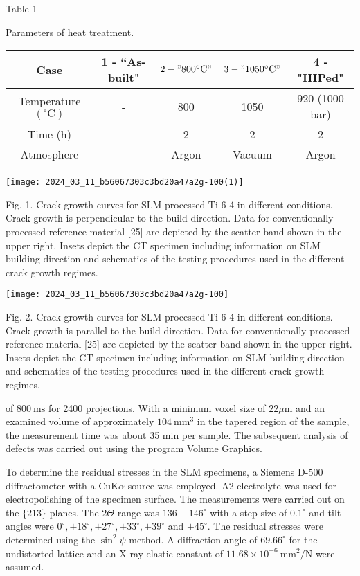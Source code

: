 \documentclass[10pt]{article}
\begin{document}
Table 1

Parameters of heat treatment.

\begin{center}
\begin{tabular}{|c|c|c|c|c|}
\hline
Case & 1 - “As-built" & $2-" 800^{\circ} \mathrm{C} "$ & $3-" 1050^{\circ} \mathrm{C} "$ & 4 - "HIPed" \\
\hline
Temperature $\left({ }^{\circ} \mathrm{C}\right)$ & - & 800 & 1050 & 920 (1000 bar) \\
\hline
Time (h) & - & 2 & 2 & 2 \\
\hline
Atmosphere & - & Argon & Vacuum & Argon \\
\hline
\end{tabular}
\end{center}

\begin{center}
\texttt{[image: 2024\_03\_11\_b56067303c3bd20a47a2g-100(1)]}
\end{center}

Fig. 1. Crack growth curves for SLM-processed Ti-6-4 in different conditions. Crack growth is perpendicular to the build direction. Data for conventionally processed reference material [25] are depicted by the scatter band shown in the upper right. Insets depict the CT specimen including information on SLM building direction and schematics of the testing procedures used in the different crack growth regimes.

\begin{center}
\texttt{[image: 2024\_03\_11\_b56067303c3bd20a47a2g-100]}
\end{center}

Fig. 2. Crack growth curves for SLM-processed Ti-6-4 in different conditions. Crack growth is parallel to the build direction. Data for conventionally processed reference material [25] are depicted by the scatter band shown in the upper right. Insets depict the CT specimen including information on SLM building direction and schematics of the testing procedures used in the different crack growth regimes.

of $800 \mathrm{~ms}$ for 2400 projections. With a minimum voxel size of $22 \mu \mathrm{m}$ and an examined volume of approximately $104 \mathrm{~mm}^{3}$ in the tapered region of the sample, the measurement time was about 35 min per sample. The subsequent analysis of defects was carried out using the program Volume Graphics.

To determine the residual stresses in the SLM specimens, a Siemens D-500 diffractometer with a $\mathrm{Cu} \mathrm{K} \alpha$-source was employed. A2 electrolyte was used for electropolishing of the specimen surface. The measurements were carried out on the $\{213\}$ planes. The $2 \Theta$ range was $136-146^{\circ}$ with a step size of $0.1^{\circ}$ and tilt angles were $0^{\circ}, \pm 18^{\circ}, \pm 27^{\circ}, \pm 33^{\circ}, \pm 39^{\circ}$ and $\pm 45^{\circ}$. The residual stresses were determined using the $\sin ^{2} \psi$-method. A diffraction angle of $69.66^{\circ}$ for the undistorted lattice and an X-ray elastic constant of $11.68 \times 10^{-6} \mathrm{~mm}^{2} / \mathrm{N}$ were assumed.
\end{document}
